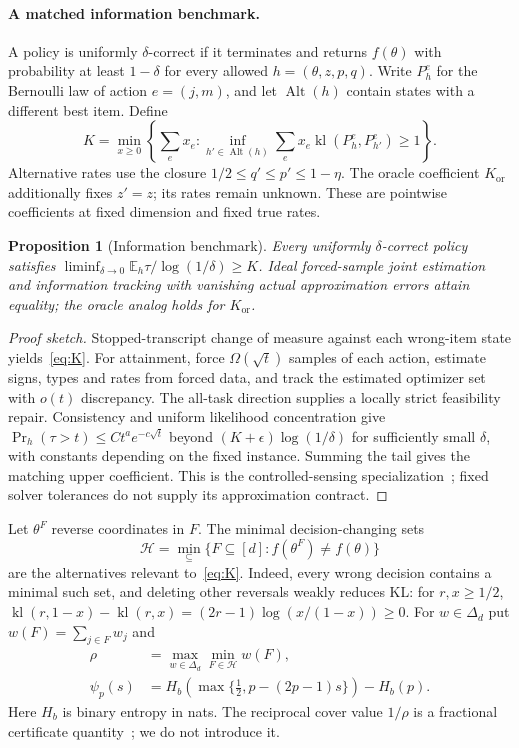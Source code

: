 \documentclass[sigconf,anonymous,review]{acmart}
\newtheorem{proposition}[theorem]{Proposition}
\newcommand{\kl}{\operatorname{kl}}
\newcommand{\E}{\mathbb E}
\newcommand{\Kor}{K_{\mathrm{or}}}
\newcommand{\cH}{\mathcal H}
\begin{document}
\paragraph{A matched information benchmark.}
A policy is uniformly $\delta$-correct if it terminates and returns $f(\theta)$ with probability at least $1-\delta$ for every allowed $h=(\theta,z,p,q)$. Write $P_h^e$ for the Bernoulli law of action $e=(j,m)$, and let $\operatorname{Alt}(h)$ contain states with a different best item. Define
\begin{equation}\label{eq:K}
 K=\min_{x\ge0}\left\{\sum_e x_e:
 \inf_{h'\in\operatorname{Alt}(h)}\sum_e x_e\kl(P_h^e,P_{h'}^e)\ge1\right\}.
\end{equation}
Alternative rates use the closure $1/2\le q'\le p'\le1-\eta$. The oracle coefficient $\Kor$ additionally fixes $z'=z$; its rates remain unknown. These are pointwise coefficients at fixed dimension and fixed true rates.
\begin{proposition}[Information benchmark]\label{prop:framework}
Every uniformly $\delta$-correct policy satisfies
$\liminf_{\delta\to0}\E_h\tau/\log(1/\delta)\ge K$.
Ideal forced-sample joint estimation and information tracking with vanishing actual approximation errors attain equality; the oracle analog holds for $\Kor$.
\end{proposition}
\begin{proof}[Proof sketch]
Stopped-transcript change of measure against each wrong-item state yields~\eqref{eq:K}. For attainment, force $\Omega(\sqrt t)$ samples of each action, estimate signs, types and rates from forced data, and track the estimated optimizer set with $o(t)$ discrepancy. The all-task direction supplies a locally strict feasibility repair. Consistency and uniform likelihood concentration give
$\Pr_h(\tau>t)\le Ct^a e^{-c\sqrt t}$ beyond $(K+\epsilon)\log(1/\delta)$ for sufficiently small $\delta$, with constants depending on the fixed instance. Summing the tail gives the matching upper coefficient. This is the controlled-sensing specialization~\cite{deshmukh2019}; fixed solver tolerances do not supply its approximation contract.
\end{proof}

Let $\theta^F$ reverse coordinates in $F$. The minimal decision-changing sets
\begin{equation}\label{eq:H}
 \cH=\min_{\subseteq}\{F\subseteq[d]:f(\theta^F)\ne f(\theta)\}
\end{equation}
are the alternatives relevant to~\eqref{eq:K}. Indeed, every wrong decision contains a minimal such set, and deleting other reversals weakly reduces KL: for $r,x\ge1/2$,
$\kl(r,1-x)-\kl(r,x)=(2r-1)\log(x/(1-x))\ge0$.
For $w\in\Delta_d$ put $w(F)=\sum_{j\in F}w_j$ and
\begin{equation}\label{eq:rho}
 \begin{split}
 \rho&=\max_{w\in\Delta_d}\min_{F\in\cH}w(F),\\
 \psi_p(s)&=H_b\!\left(\max\{\tfrac12,p-(2p-1)s\}\right)-H_b(p).
 \end{split}
\end{equation}
Here $H_b$ is binary entropy in nats. The reciprocal cover value $1/\rho$ is a fractional certificate quantity~\cite{kulkarni2013}; we do not introduce it.
\end{document}
